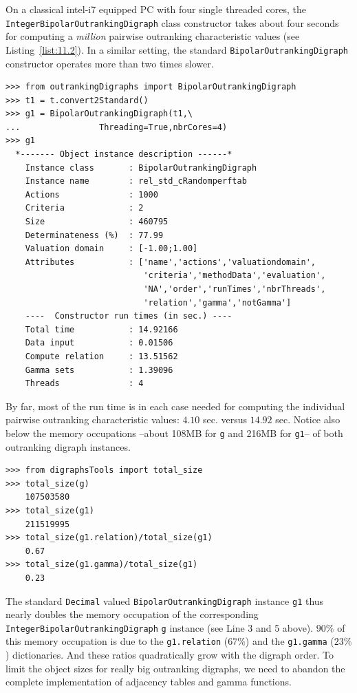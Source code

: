 On a classical intel-i7 equipped PC with four single threaded cores, the \texttt{Inte\-ger\-BipolarOutrankingDigraph} class constructor takes about four seconds for computing a \emph{million} pairwise outranking characteristic values (see Listing~\vref{list:11.2}). In a similar setting, the standard \texttt{BipolarOutranking\-Digraph} constructor operates more than two times slower.
\begin{lstlisting}
>>> from outrankingDigraphs import BipolarOutrankingDigraph
>>> t1 = t.convert2Standard()
>>> g1 = BipolarOutrankingDigraph(t1,\
...                Threading=True,nbrCores=4)
>>> g1
  *------- Object instance description ------*
    Instance class       : BipolarOutrankingDigraph
    Instance name        : rel_std_cRandomperftab
    Actions              : 1000
    Criteria             : 2
    Size                 : 460795
    Determinateness (%)  : 77.99
    Valuation domain     : [-1.00;1.00]
    Attributes           : ['name','actions','valuationdomain',
                            'criteria','methodData','evaluation',
                            'NA','order','runTimes','nbrThreads',
                            'relation','gamma','notGamma']
    ----  Constructor run times (in sec.) ----
    Total time           : 14.92166
    Data input           : 0.01506
    Compute relation     : 13.51562
    Gamma sets           : 1.39096
    Threads              : 4
\end{lstlisting}

By far, most of the run time is in each case needed for computing the individual pairwise outranking characteristic values: $4.10$ sec. versus $14.92$ sec. Notice also below the memory occupations --about 108MB for \texttt{g} and 216MB for \texttt{g1}-- of both outranking digraph instances.
\begin{lstlisting}
>>> from digraphsTools import total_size
>>> total_size(g)
    107503580
>>> total_size(g1)
    211519995
>>> total_size(g1.relation)/total_size(g1)
    0.67
>>> total_size(g1.gamma)/total_size(g1)
    0.23
\end{lstlisting}

The standard \texttt{Decimal} valued \texttt{BipolarOutrankingDigraph} instance \texttt{g1} thus nearly doubles the memory occupation of the corresponding \texttt{IntegerBipo\-larOutrankingDigraph} \texttt{g} instance (see Line 3 and 5 above). $90\%$ of this memory occupation is due to the \texttt{g1.relation} ($67\%$) and the \texttt{g1.gamma} ($23\%$) dictionaries. And these ratios quadratically grow with the digraph order. To limit the object sizes for really big outranking digraphs, we need to abandon the complete implementation of adjacency tables and gamma functions.

